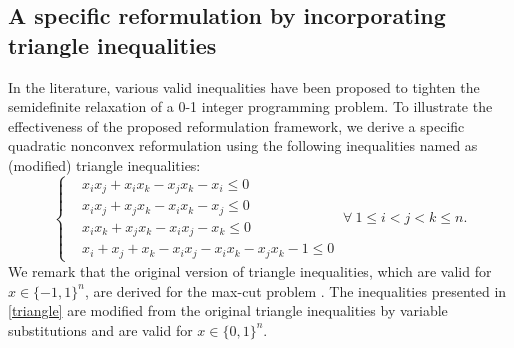 \documentclass[pdflatex,sn-mathphys-num]{sn-jnl}%
\theoremstyle{thmstyleone}%
\theoremstyle{thmstyletwo}%
\theoremstyle{thmstylethree}%
\begin{document}
\subsection{A specific reformulation by incorporating triangle inequalities}

In the literature, various valid inequalities have been proposed to tighten the semidefinite relaxation of a 0-1 integer programming problem. To illustrate the effectiveness of the proposed reformulation framework, we derive a specific quadratic nonconvex reformulation using the following inequalities named as (modified) triangle inequalities:
\begin{equation}\label{triangle}
	\left\{
	\begin{aligned}
		&x_ix_j + x_i x_k-x_j x_k-x_i\leq 0\\
		&x_ix_j + x_j x_k-x_i x_k-x_j\leq 0\\
		&x_ix_k + x_j x_k-x_i x_j-x_k\leq 0\\
		&x_i+x_j+x_k-x_i x_j -x_i x_k-x_jx_k-1\leq 0
	\end{aligned}\right.~\forall ~1\leq i<j<k\leq n.
\end{equation}
We remark that the original version of triangle inequalities, which are valid for $x\in\{-1,1\}^n$, are derived for the max-cut problem \cite{Helmberg,Rendl}. The inequalities presented in \eqref{triangle} are modified from the original triangle inequalities by variable substitutions and are valid for $x\in\{0,1\}^n$.

\end{document}
